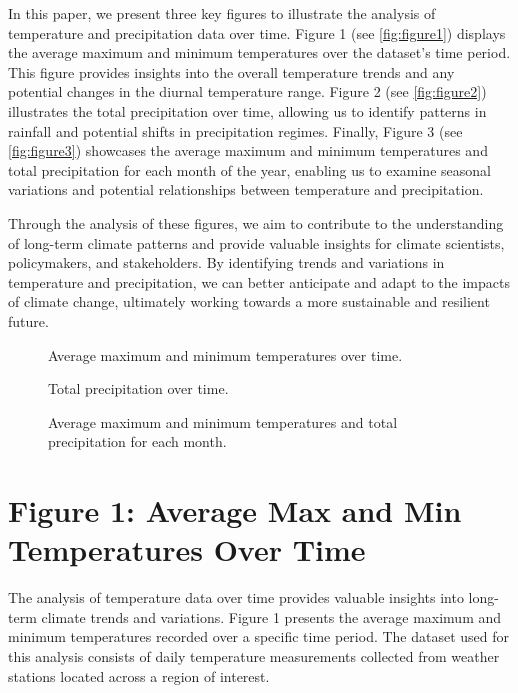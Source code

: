 \documentclass{article}
\begin{document}
In this paper, we present three key figures to illustrate the analysis of temperature and precipitation data over time. Figure 1 (see \autoref{fig:figure1}) displays the average maximum and minimum temperatures over the dataset's time period. This figure provides insights into the overall temperature trends and any potential changes in the diurnal temperature range. Figure 2 (see \autoref{fig:figure2}) illustrates the total precipitation over time, allowing us to identify patterns in rainfall and potential shifts in precipitation regimes. Finally, Figure 3 (see \autoref{fig:figure3}) showcases the average maximum and minimum temperatures and total precipitation for each month of the year, enabling us to examine seasonal variations and potential relationships between temperature and precipitation.

Through the analysis of these figures, we aim to contribute to the understanding of long-term climate patterns and provide valuable insights for climate scientists, policymakers, and stakeholders. By identifying trends and variations in temperature and precipitation, we can better anticipate and adapt to the impacts of climate change, ultimately working towards a more sustainable and resilient future.

\begin{figure}[htbp]
  \centering
  \caption{Average maximum and minimum temperatures over time.}
  \label{fig:figure1}
\end{figure}

\begin{figure}[htbp]
  \centering
  \caption{Total precipitation over time.}
  \label{fig:figure2}
\end{figure}

\begin{figure}[htbp]
  \centering
  \caption{Average maximum and minimum temperatures and total precipitation for each month.}
  \label{fig:figure3}
\end{figure}
\section{Figure 1: Average Max and Min Temperatures Over Time}

The analysis of temperature data over time provides valuable insights into long-term climate trends and variations. Figure 1 presents the average maximum and minimum temperatures recorded over a specific time period. The dataset used for this analysis consists of daily temperature measurements collected from weather stations located across a region of interest.
\end{document}
